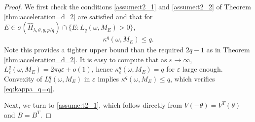 \documentclass[11pt]{amsart}
\begin{document}
\begin{proof}
We first check the conditions \eqref{assume:t2_1} and \eqref{assume:t2_2} of Theorem \ref{thm:acceleration=d_2} are satisfied and that for $E\in \sigma(\widehat{H}_{\lambda,\theta,y,p/q})\cap \{E: L_q(\omega,M_E)>0\}$,
\begin{align}\label{eq:kappa_q=q}
\kappa^q(\omega,M_E)\leq q.
\end{align}
Note this provides a tighter upper bound than the required $2q-1$ as in Theorem \ref{thm:acceleration=d_2}.
It is easy to compute that as $\varepsilon\to\infty$, $L^q_\varepsilon(\omega,M_E)=2\pi q\varepsilon+o(1)$, hence $\kappa^q_\varepsilon(\omega,M_E)=q$ for $\varepsilon$ large enough. 
Convexity of $L^q_\varepsilon(\omega,M_E)$ in $\varepsilon$ implies $\kappa^q(\omega,M_E)\leq q$,
which verifies \eqref{eq:kappa_q=q}.

Next, we turn to \eqref{assume:t2_1}, which follow directly from $V(-\theta)=V^T(\theta)$ and $B=B^T$.


\end{proof}
\end{document}
